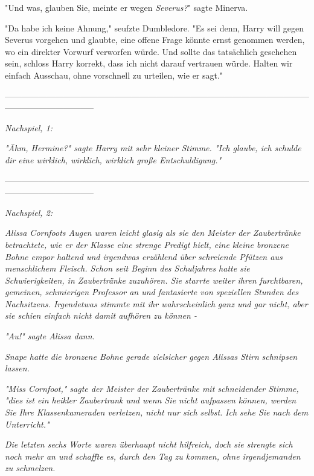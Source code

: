{"Und was, glauben Sie, meinte er wegen \emph{Severus?}" sagte Minerva.

"Da habe ich keine Ahnung," seufzte Dumbledore. "Es sei denn, Harry will gegen Severus vorgehen und glaubte, eine offene Frage könnte ernst genommen werden, wo ein direkter Vorwurf verworfen würde. Und sollte das tatsächlich geschehen sein, schloss Harry korrekt, dass ich nicht darauf vertrauen würde. Halten wir einfach Ausschau, ohne vorschnell zu urteilen, wie er sagt."

--------------------------------------------------------------------------------------------------------------------------------------------

\emph{\emph{Nachspiel, 1:}}

\emph{"Ähm, Hermine?" sagte Harry mit sehr kleiner Stimme. "Ich glaube, ich schulde dir eine wirklich, wirklich, wirklich große Entschuldigung."}

--------------------------------------------------------------------------------------------------------------------------------------------

\emph{\emph{Nachspiel, 2:}}

\emph{Alissa Cornfoots Augen waren leicht glasig als sie den Meister der Zaubertränke betrachtete, wie er der Klasse eine strenge Predigt hielt, eine kleine bronzene Bohne empor haltend und irgendwas erzählend über schreiende Pfützen aus menschlichem Fleisch. Schon seit Beginn des Schuljahres hatte sie Schwierigkeiten, in Zaubertränke zuzuhören. Sie starrte weiter ihren furchtbaren, gemeinen, schmierigen Professor an und fantasierte von speziellen Stunden des Nachsitzens. Irgendetwas stimmte mit ihr wahrscheinlich} \emph{\emph{ganz und gar nicht,}} \emph{aber sie schien einfach nicht damit aufhören zu können -}

\emph{"Au!" sagte Alissa dann.}

\emph{Snape hatte die bronzene Bohne gerade zielsicher gegen Alissas Stirn} \emph{schnipsen lassen.}

\emph{"Miss Cornfoot," sagte der Meister der Zaubertränke mit schneidender Stimme, "dies ist ein heikler Zaubertrank und wenn Sie nicht aufpassen können, werden Sie Ihre Klassenkameraden verletzen, nicht nur sich selbst.} \emph{Ich sehe Sie nach dem Unterricht."}

\emph{Die letzten sechs} \emph{Worte waren überhaupt nicht hilfreich, doch sie strengte sich noch mehr an und schaffte es, durch den Tag zu kommen, ohne irgendjemanden} \emph{zu schmelzen.}

}
